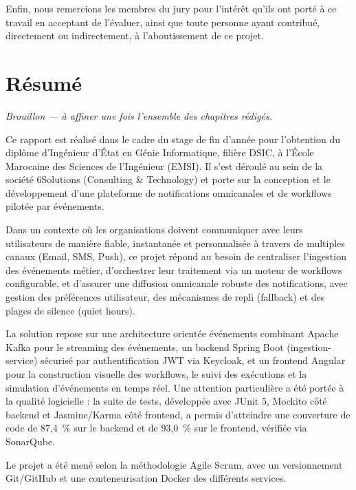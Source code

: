 \documentclass[12pt,a4paper]{report}
\begin{document}
Enfin, nous remercions les membres du jury pour l'intérêt qu'ils ont porté à ce travail en acceptant de l'évaluer, ainsi que toute personne ayant contribué, directement ou indirectement, à l'aboutissement de ce projet.

\chapter*{Résumé}

\textcolor{placeholderred}{\itshape Brouillon --- à affiner une fois l'ensemble des chapitres rédigés.}

\bigskip

Ce rapport est réalisé dans le cadre du stage de fin d'année pour l'obtention du diplôme d'Ingénieur d'État en Génie Informatique, filière DSIC, à l'École Marocaine des Sciences de l'Ingénieur (EMSI). Il s'est déroulé au sein de la société 6Solutions (Consulting \& Technology) et porte sur la conception et le développement d'une plateforme de notifications omnicanales et de workflows pilotée par événements.

Dans un contexte où les organisations doivent communiquer avec leurs utilisateurs de manière fiable, instantanée et personnalisée à travers de multiples canaux (Email, SMS, Push), ce projet répond au besoin de centraliser l'ingestion des événements métier, d'orchestrer leur traitement via un moteur de workflows configurable, et d'assurer une diffusion omnicanale robuste des notifications, avec gestion des préférences utilisateur, des mécanismes de repli (fallback) et des plages de silence (quiet hours).

La solution repose sur une architecture orientée événements combinant Apache Kafka pour le streaming des événements, un backend Spring Boot (ingestion-service) sécurisé par authentification JWT via Keycloak, et un frontend Angular pour la construction visuelle des workflows, le suivi des exécutions et la simulation d'événements en temps réel. Une attention particulière a été portée à la qualité logicielle : la suite de tests, développée avec JUnit 5, Mockito côté backend et Jasmine/Karma côté frontend, a permis d'atteindre une couverture de code de 87,4~\% sur le backend et de 93,0~\% sur le frontend, vérifiée via SonarQube.

Le projet a été mené selon la méthodologie Agile Scrum, avec un versionnement Git/GitHub et une conteneurisation Docker des différents services.
\end{document}
